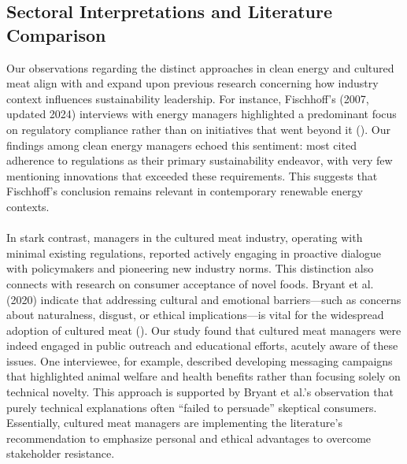 	\subsection{Sectoral Interpretations and Literature Comparison}
	Our observations regarding the distinct approaches in clean energy and cultured meat align with and expand upon previous research concerning how industry context influences sustainability leadership. For instance, Fischhoff’s (2007, updated 2024) interviews with energy managers highlighted a predominant focus on regulatory compliance rather than on initiatives that went beyond it (\textcite{Fischhoff2024}). Our findings among clean energy managers echoed this sentiment: most cited adherence to regulations as their primary sustainability endeavor, with very few mentioning innovations that exceeded these requirements. This suggests that Fischhoff’s conclusion remains relevant in contemporary renewable energy contexts.
	
	\paragraph*{} In stark contrast, managers in the cultured meat industry, operating with minimal existing regulations, reported actively engaging in proactive dialogue with policymakers and pioneering new industry norms. This distinction also connects with research on consumer acceptance of novel foods. Bryant et al. (2020) indicate that addressing cultural and emotional barriers—such as concerns about naturalness, disgust, or ethical implications—is vital for the widespread adoption of cultured meat (\textcite{Bryant2020}). Our study found that cultured meat managers were indeed engaged in public outreach and educational efforts, acutely aware of these issues. One interviewee, for example, described developing messaging campaigns that highlighted animal welfare and health benefits rather than focusing solely on technical novelty. This approach is supported by Bryant et al.’s observation that purely technical explanations often ``failed to persuade'' skeptical consumers. Essentially, cultured meat managers are implementing the literature’s recommendation to emphasize personal and ethical advantages to overcome stakeholder resistance.
	
